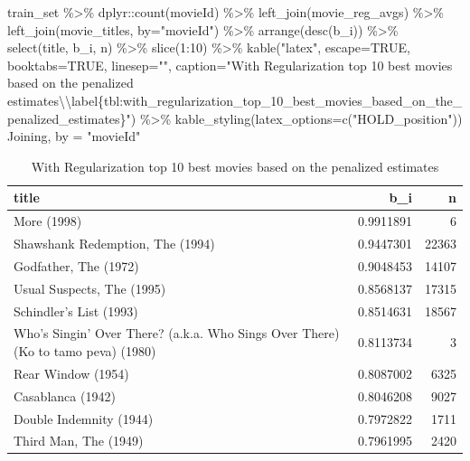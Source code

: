 \documentclass[
]{article}
\newenvironment{Shaded}{}{}
\newcommand{\AttributeTok}[1]{\textcolor[rgb]{0.49,0.56,0.16}{#1}}
\newcommand{\ConstantTok}[1]{\textcolor[rgb]{0.53,0.00,0.00}{#1}}
\newcommand{\DecValTok}[1]{\textcolor[rgb]{0.25,0.63,0.44}{#1}}
\newcommand{\FunctionTok}[1]{\textcolor[rgb]{0.02,0.16,0.49}{#1}}
\newcommand{\NormalTok}[1]{#1}
\newcommand{\OtherTok}[1]{\textcolor[rgb]{0.00,0.44,0.13}{#1}}
\newcommand{\SpecialCharTok}[1]{\textcolor[rgb]{0.25,0.44,0.63}{#1}}
\newcommand{\StringTok}[1]{\textcolor[rgb]{0.25,0.44,0.63}{#1}}
\begin{document}
\begin{Shaded}
\begin{Highlighting}[]
\NormalTok{train\_set }\SpecialCharTok{\%\textgreater{}\%}
\NormalTok{  dplyr}\SpecialCharTok{::}\FunctionTok{count}\NormalTok{(movieId) }\SpecialCharTok{\%\textgreater{}\%} 
  \FunctionTok{left\_join}\NormalTok{(movie\_reg\_avgs) }\SpecialCharTok{\%\textgreater{}\%}
  \FunctionTok{left\_join}\NormalTok{(movie\_titles, }\AttributeTok{by=}\StringTok{"movieId"}\NormalTok{) }\SpecialCharTok{\%\textgreater{}\%}
  \FunctionTok{arrange}\NormalTok{(}\FunctionTok{desc}\NormalTok{(b\_i)) }\SpecialCharTok{\%\textgreater{}\%} 
  \FunctionTok{select}\NormalTok{(title, b\_i, n) }\SpecialCharTok{\%\textgreater{}\%} 
  \FunctionTok{slice}\NormalTok{(}\DecValTok{1}\SpecialCharTok{:}\DecValTok{10}\NormalTok{) }\SpecialCharTok{\%\textgreater{}\%} 
  \FunctionTok{kable}\NormalTok{(}\StringTok{"latex"}\NormalTok{, }\AttributeTok{escape=}\ConstantTok{TRUE}\NormalTok{, }\AttributeTok{booktabs=}\ConstantTok{TRUE}\NormalTok{, }\AttributeTok{linesep=}\StringTok{""}\NormalTok{, }\AttributeTok{caption=}\StringTok{"With Regularization top 10 best movies based on the penalized estimates}\SpecialCharTok{\textbackslash{}\textbackslash{}}\StringTok{label\{tbl:with\_regularization\_top\_10\_best\_movies\_based\_on\_the\_penalized\_estimates\}"}\NormalTok{) }\SpecialCharTok{\%\textgreater{}\%} \FunctionTok{kable\_styling}\NormalTok{(}\AttributeTok{latex\_options=}\FunctionTok{c}\NormalTok{(}\StringTok{"HOLD\_position"}\NormalTok{))}
\NormalTok{Joining, by }\OtherTok{=} \StringTok{"movieId"}
\end{Highlighting}
\end{Shaded}

\begin{table}[H]

\caption{\label{tab:m7_4}With Regularization top 10 best movies based on the penalized estimates\label{tbl:with_regularization_top_10_best_movies_based_on_the_penalized_estimates}}
\centering
\begin{tabular}[t]{lrr}
\toprule
title & b\_i & n\\
\midrule
More (1998) & 0.9911891 & 6\\
Shawshank Redemption, The (1994) & 0.9447301 & 22363\\
Godfather, The (1972) & 0.9048453 & 14107\\
Usual Suspects, The (1995) & 0.8568137 & 17315\\
Schindler's List (1993) & 0.8514631 & 18567\\
Who's Singin' Over There? (a.k.a. Who Sings Over There) (Ko to tamo peva) (1980) & 0.8113734 & 3\\
Rear Window (1954) & 0.8087002 & 6325\\
Casablanca (1942) & 0.8046208 & 9027\\
Double Indemnity (1944) & 0.7972822 & 1711\\
Third Man, The (1949) & 0.7961995 & 2420\\
\bottomrule
\end{tabular}
\end{table}
\end{document}
